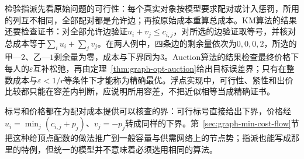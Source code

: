 检验指派先看原始问题的可行性：每个真实对象按模型要求配对或计入惩罚，所用的列互不相同，全部配对都是允许边；再按原始成本重算总成本。KM算法的结果还要检查证书：对全部允许边验证$u_i+v_j\leq c_{i,j}$，对所选的边验证取等号，并核对总成本等于$\sum_iu_i+\sum_jv_j$。在两人例中，四条边的剩余量依次为$0,0,0,2$，所选的甲—$2$、乙—$1$剩余量为零，成本与下界同为$3$。Auction算法的结果检查最终价格下每人的$\varepsilon$互补松弛，再由定理~\ref{thm:graph-opt-auction}给出目标误差界；只有在整数成本与$\varepsilon<1/r$等条件下才能称为精确最优。浮点实现中，可行性、紧性和出价比较都只能在容差内判断，应说明所用容差，不把近似相等当成精确证书。

标号和价格都在为配对成本提供可以核查的界：可行标号直接给出下界，价格经$u_i=\min_j(c_{i,j}+p_j)$、$v_j=-p_j$转成同样的下界。第~\ref{sec:graph-min-cost-flow}节把这种给顶点配数的做法推广到一般容量与供需网络上的节点势；指派也能写成那里的特例，但统一的模型并不意味着必须选用相同的算法。

